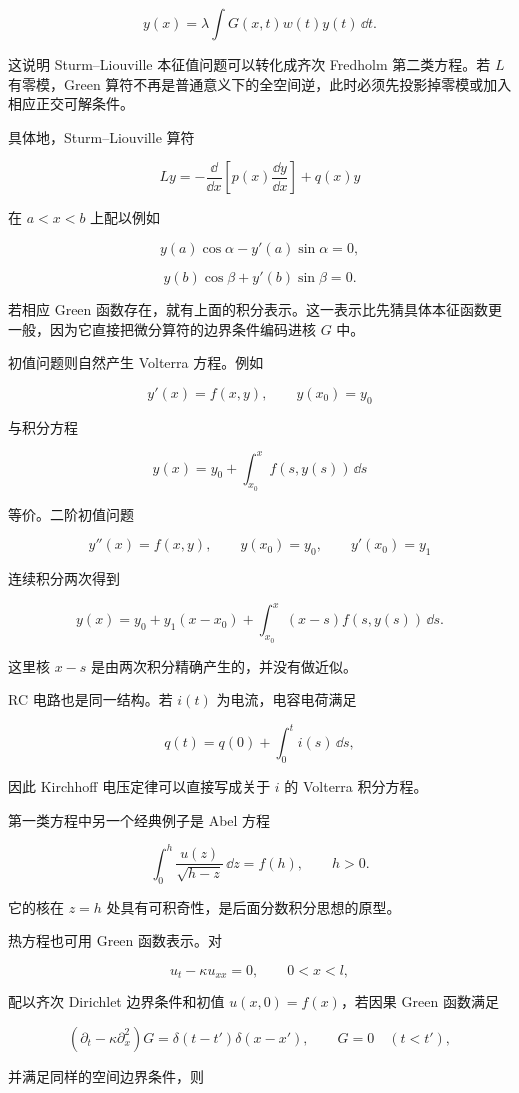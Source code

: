 \[
{
y(x)=\lambda\int G(x,t)w(t)y(t)\,\dd t
}.
\]

这说明 Sturm--Liouville 本征值问题可以转化成齐次 Fredholm 第二类方程。若 $L$ 有零模，Green 算符不再是普通意义下的全空间逆，此时必须先投影掉零模或加入相应正交可解条件。

具体地，Sturm--Liouville 算符

\[
L y=-\frac{\dd}{\dd x}
\left[p(x)\frac{\dd y}{\dd x}\right]+q(x)y
\]

在 $a<x<b$ 上配以例如

\[
y(a)\cos\alpha-y'(a)\sin\alpha=0,
\]

\[
y(b)\cos\beta+y'(b)\sin\beta=0.
\]

若相应 Green 函数存在，就有上面的积分表示。这一表示比先猜具体本征函数更一般，因为它直接把微分算符的边界条件编码进核 $G$ 中。

初值问题则自然产生 Volterra 方程。例如

\[
y'(x)=f(x,y),\qquad y(x_0)=y_0
\]

与积分方程

\[
{
y(x)=y_0+\int_{x_0}^x f(s,y(s))\,\dd s
}
\]

等价。二阶初值问题

\[
y''(x)=f(x,y),
\qquad y(x_0)=y_0,
\qquad y'(x_0)=y_1
\]

连续积分两次得到

\[
{
y(x)=y_0+y_1(x-x_0)
+\int_{x_0}^x(x-s)f(s,y(s))\,\dd s
}.
\]

这里核 $x-s$ 是由两次积分精确产生的，并没有做近似。

RC 电路也是同一结构。若 $i(t)$ 为电流，电容电荷满足

\[
q(t)=q(0)+\int_0^t i(s)\,\dd s,
\]

因此 Kirchhoff 电压定律可以直接写成关于 $i$ 的 Volterra 积分方程。

第一类方程中另一个经典例子是 Abel 方程

\[
\int_0^h\frac{u(z)}{\sqrt{h-z}}\,\dd z=f(h),
\qquad h>0.
\]

它的核在 $z=h$ 处具有可积奇性，是后面分数积分思想的原型。

热方程也可用 Green 函数表示。对

\[
u_t-\kappa u_{xx}=0,
\qquad 0<x<l,
\]

配以齐次 Dirichlet 边界条件和初值 $u(x,0)=f(x)$，若因果 Green 函数满足

\[
(\partial_t-\kappa\partial_x^2)G
=\delta(t-t')\delta(x-x'),
\qquad G=0\quad(t<t'),
\]

并满足同样的空间边界条件，则

